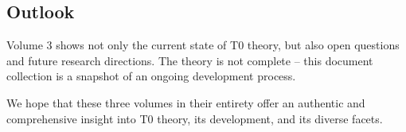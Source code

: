\subsection*{Outlook}

Volume 3 shows not only the current state of T0 theory, but also open questions and future research directions. The theory is not complete -- this document collection is a snapshot of an ongoing development process.

\vspace{1em}
\noindent
We hope that these three volumes in their entirety offer an authentic and comprehensive insight into T0 theory, its development, and its diverse facets.


